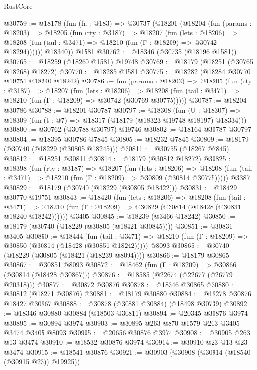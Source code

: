 \begin{lexlean}{RustCore}
\begin{coremodule}
@30759 := @18178
    (fun (fn : @183) =>
    @30737
      (@18201
        (@18204
          (fun (params : @18203) =>
          @18205
            (fun (rty : @3187) =>
            @18207
              (fun (lets : @18206) =>
              @18208 (fun (tail : @3471) => @18210 (fun (Γ : @18209) => @30742 @18294))))))
        @18340))
    @1581
@30762 := @18346 (@30735 (@18196 @1581))
@30765 := @18259 (@18260 @1581) @19748
@30769 := @18179 (@18251 (@30765 @18268) @18272)
@30770 := @18285 @1581
@30775 := @18282 (@18284 @30770 @19751 @18240 @18242)
@30786 := fun (params : @18203) =>
  @18205
    (fun (rty : @3187) =>
    @18207
      (fun (lets : @18206) =>
      @18208 (fun (tail : @3471) => @18210 (fun (Γ : @18209) => @30742 (@30769 @30775)))))
@30787 := @18204 @30786
@30788 := @18201 @30787
@30797 := @18308
    (fun (U : @18307) => @18309 (fun (t : @7) => @18317 (@18179 (@18323 @19748 @18197) @18334)))
@30800 := @30762 (@30788 @30797) @19746
@30802 := @18164 @30787 @30797
@30804 := @18395 @30786 @7845
@30805 := @18232 @7845
@30809 := @18179 (@30740 (@18229 (@30805 @18245)))
@30811 := @30765 (@18267 @7845)
@30812 := @18251 @30811
@30814 := @18179 (@30812 @18272)
@30825 := @18398
    (fun (rty : @3187) =>
    @18207
      (fun (lets : @18206) =>
      @18208 (fun (tail : @3471) => @18210 (fun (Γ : @18209) => @30809 (@30814 @30775)))))
    @3387
@30829 := @18179 (@30740 (@18229 (@30805 @18422)))
@30831 := @18429 @30770 @19751
@30843 := @18420
    (fun (lets : @18206) =>
    @18208
      (fun (tail : @3471) =>
      @18210 (fun (Γ : @18209) => @30829 (@30814 (@18428 (@30831 @18240 @18242))))))
    @3405
@30845 := @18239 (@3466 @18242)
@30850 := @18179 (@30740 (@18229 (@30805 (@18421 @30845))))
@30851 := @30831 @3405
@30860 := @18444
    (fun (tail : @3471) => @18210 (fun (Γ : @18209) => @30850 (@30814 (@18428 (@30851 @18242)))))
    @8093
@30865 := @30740 (@18229 (@30805 (@18421 (@18239 @8094))))
@30866 := @18179 @30865
@30867 := @30851 @8093
@30872 := @18462 (fun (Γ : @18209) => @30866 (@30814 (@18428 @30867)))
@30876 := @18585 (@22674 (@22677 (@26779 @20318)))
@30877 := @30872 @30876
@30878 := @18346 @30865
@30880 := @30812 (@18271 @30876)
@30881 := @18179 @30880
@30884 := @18278 @30876 @18427 @30867
@30888 := @30878 (@30881 @30884) (@18498 @30739)
@30892 := @18346 @30880 @30884 (@18503 @30811)
@30894 := @20345 @30876 @3974
@30895 := @30894 @3974
@30903 := @30895 @263 @870 @1579 @203 @3405 @3474 @3405 @8093
@30905 := @20656 @30876 @3974
@30908 := @30905 @263 @13 @3474
@30910 := @18532 @30876 @3974
@30914 := @30910 @23 @13 @23 @3474
@30915 := @18541 @30876
@30921 := @30903 (@30908 (@30914 (@18540 (@30915 @23)) @19925))

\end{coremodule}
\end{lexlean}
